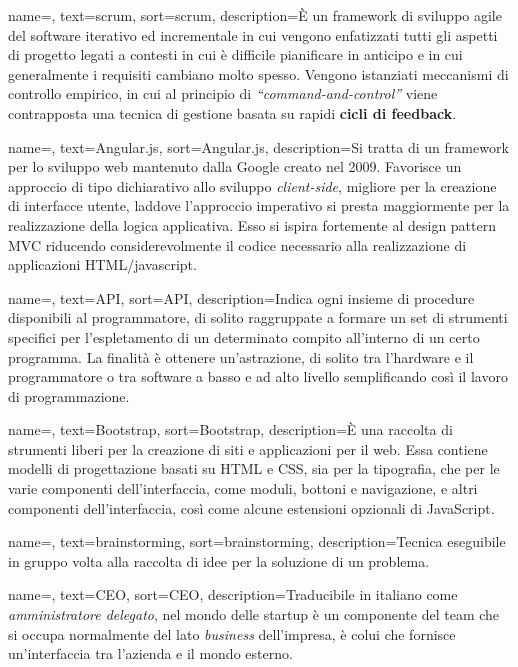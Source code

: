 {
    name=,
    text=scrum,
    sort=scrum,
    description={È un framework di sviluppo agile del software iterativo ed incrementale in cui vengono enfatizzati tutti gli aspetti di progetto legati a contesti in cui è difficile pianificare in anticipo e in cui generalmente i requisiti cambiano molto spesso. Vengono istanziati meccanismi di controllo empirico, in cui al principio di \textit{``command-and-control''} viene contrapposta una tecnica di gestione basata su rapidi \textbf{cicli di feedback}.}
}

{
    name=,
    text=Angular.js,
    sort=Angular.js,
    description={Si tratta di un framework per lo sviluppo web mantenuto dalla Google creato nel 2009. Favorisce un approccio di tipo dichiarativo allo sviluppo \textit{client-side}, migliore per la creazione di interfacce utente, laddove l'approccio imperativo si presta maggiormente per la realizzazione della logica applicativa. Esso si ispira fortemente al design pattern MVC riducendo considerevolmente il codice necessario alla realizzazione di applicazioni HTML/javascript.}
}

{
    name=,
    text=API,
    sort=API,
    description={Indica ogni insieme di procedure disponibili al programmatore, di solito raggruppate a formare un set di strumenti specifici per l'espletamento di un determinato compito all'interno di un certo programma. La finalità è ottenere un'astrazione, di solito tra l'hardware e il programmatore o tra software a basso e ad alto livello semplificando così il lavoro di programmazione.}
}

{
    name=,
    text=Bootstrap,
    sort=Bootstrap,
    description={È una raccolta di strumenti liberi per la creazione di siti e applicazioni per il web. Essa contiene modelli di progettazione basati su HTML e CSS, sia per la tipografia, che per le varie componenti dell'interfaccia, come moduli, bottoni e navigazione, e altri componenti dell'interfaccia, così come alcune estensioni opzionali di JavaScript.}
}

{
    name=,
    text=brainstorming,
    sort=brainstorming,
    description={Tecnica eseguibile in gruppo volta alla raccolta di idee per la soluzione di un problema.}
}

{
    name=,
    text=CEO,
    sort=CEO,
    description={Traducibile in italiano come \textit{amministratore delegato}, nel mondo delle startup è un componente del team che si occupa normalmente del lato \textit{business} dell'impresa, è colui che fornisce un'interfaccia tra l'azienda e il mondo esterno.}
}

